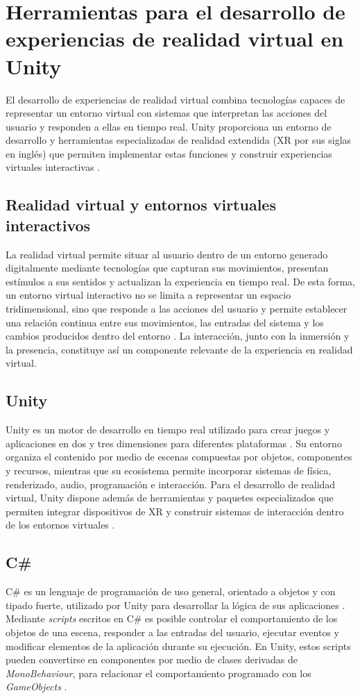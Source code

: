 % 
\section{Herramientas para el desarrollo de experiencias de realidad virtual en Unity}
El desarrollo de experiencias de realidad virtual combina tecnologías capaces de representar un entorno virtual con sistemas que interpretan las acciones del usuario y responden a ellas en tiempo real. Unity proporciona un entorno de desarrollo y herramientas especializadas de realidad extendida (XR por sus siglas en inglés) que permiten implementar estas funciones y construir experiencias virtuales interactivas \cite{merienne2016virtual,unity2026xritoolkit}.
\subsection{Realidad virtual y entornos virtuales interactivos}
La realidad virtual permite situar al usuario dentro de un entorno generado digitalmente mediante tecnologías que capturan sus movimientos, presentan estímulos a sus sentidos y actualizan la experiencia en tiempo real. De esta forma, un entorno virtual interactivo no se limita a representar un espacio tridimensional, sino que responde a las acciones del usuario y permite establecer una relación continua entre sus movimientos, las entradas del sistema y los cambios producidos dentro del entorno \cite{merienne2016virtual}. La interacción, junto con la inmersión y la presencia, constituye así un componente relevante de la experiencia en realidad virtual.
\subsection{Unity}
Unity es un motor de desarrollo en tiempo real utilizado para crear juegos y aplicaciones en dos y tres dimensiones para diferentes plataformas \cite{unity2026engine}. Su entorno organiza el contenido por medio de escenas compuestas por objetos, componentes y recursos, mientras que su ecosistema permite incorporar sistemas de física, renderizado, audio, programación e interacción. Para el desarrollo de realidad virtual, Unity dispone además de herramientas y paquetes especializados que permiten integrar dispositivos de XR y construir sistemas de interacción dentro de los entornos virtuales \cite{unity2026engine,unity2026vroverview}.
\subsection{C\#}
C\# es un lenguaje de programación de uso general, orientado a objetos y con tipado fuerte, utilizado por Unity para desarrollar la lógica de sus aplicaciones \cite{microsoft2026csharp,unity2026scripting}. Mediante \emph{scripts} escritos en C\# es posible controlar el comportamiento de los objetos de una escena, responder a las entradas del usuario, ejecutar eventos y modificar elementos de la aplicación durante su ejecución. En Unity, estos scripts pueden convertirse en componentes por medio de clases derivadas de \emph{MonoBehaviour}, para relacionar el comportamiento programado con los \emph{GameObjects} \cite{unity2026scripting}.
